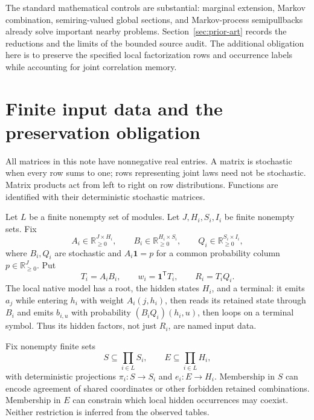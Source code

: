 \documentclass[11pt]{article}
\newcommand{\R}{\mathbb R}
\newcommand{\one}{\mathbf 1}
\theoremstyle{remark}
\begin{document}
The standard mathematical controls are substantial: marginal extension, Markov combination, semiring-valued global sections, and Markov-process semipullbacks already solve important nearby problems. Section~\ref{sec:prior-art} records the reductions and the limits of the bounded source audit. The additional obligation here is to preserve the specified local factorization rows and occurrence labels while accounting for joint correlation memory.

\section{Finite input data and the preservation obligation}\label{sec:data}

All matrices in this note have nonnegative real entries. A matrix is stochastic when every row sums to one; rows representing joint laws need not be stochastic. Matrix products act from left to right on row distributions. Functions are identified with their deterministic stochastic matrices.

Let $L$ be a finite nonempty set of modules. Let $J,H_i,S_i,I_i$ be finite nonempty sets. Fix
\[
 A_i\in\R_{\ge0}^{J\times H_i},\qquad
 B_i\in\R_{\ge0}^{H_i\times S_i},\qquad
 Q_i\in\R_{\ge0}^{S_i\times I_i},
\]
where $B_i,Q_i$ are stochastic and $A_i\one=p$ for a common probability column $p\in\R_{\ge0}^J$. Put
\[
 T_i=A_iB_i,\qquad w_i=\one^{\mathsf T}T_i,
 \qquad R_i=T_iQ_i.
\]
The local native model has a root, the hidden states $H_i$, and a terminal: it emits $a_j$ while entering $h_i$ with weight $A_i(j,h_i)$, then reads its retained state through $B_i$ and emits $b_{i,u}$ with probability $(B_iQ_i)(h_i,u)$, then loops on a terminal symbol. Thus its hidden factors, not just $R_i$, are named input data.

Fix nonempty finite sets
\[
 S\subseteq\prod_{i\in L}S_i,\qquad
 E\subseteq\prod_{i\in L}H_i,
\]
with deterministic projections $\pi_i:S\to S_i$ and $e_i:E\to H_i$. Membership in $S$ can encode agreement of shared coordinates or other forbidden retained combinations. Membership in $E$ can constrain which local hidden occurrences may coexist. Neither restriction is inferred from the observed tables.
\end{document}
